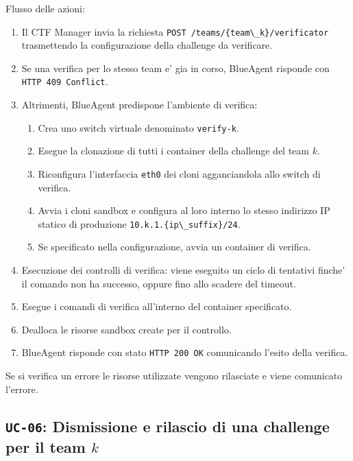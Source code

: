 Flusso delle azioni:

\begin{enumerate}
\def\labelenumi{\arabic{enumi}.}
\tightlist
\item
  Il CTF Manager invia la richiesta
  \passthrough{\lstinline!POST /teams/\{team\_k\}/verificator!}
  trasmettendo la configurazione della challenge da verificare.
\item
  Se una verifica per lo stesso team e' gia in corso, BlueAgent risponde
  con \passthrough{\lstinline!HTTP 409 Conflict!}.
\item
  Altrimenti, BlueAgent predispone l'ambiente di verifica:

  \begin{enumerate}
  \def\labelenumii{\arabic{enumii}.}
  \tightlist
  \item
    Crea uno switch virtuale denominato
    \passthrough{\lstinline!verify-k!}.
  \item
    Esegue la clonazione di tutti i container della challenge del team
    \(k\).
  \item
    Riconfigura l'interfaccia \passthrough{\lstinline!eth0!} dei cloni
    agganciandola allo switch di verifica.
  \item
    Avvia i cloni sandbox e configura al loro interno lo stesso
    indirizzo IP statico di produzione
    \passthrough{\lstinline!10.k.1.\{ip\_suffix\}/24!}.
  \item
    Se specificato nella configurazione, avvia un container di verifica.
  \end{enumerate}
\item
  Esecuzione dei controlli di verifica: viene eseguito un ciclo di
  tentativi finche' il comando non ha successo, oppure fino allo scadere
  del timeout.
\item
  Esegue i comandi di verifica all'interno del container specificato.
\item
  Dealloca le risorse sandbox create per il controllo.
\item
  BlueAgent risponde con stato \passthrough{\lstinline!HTTP 200 OK!}
  comunicando l'esito della verifica.
\end{enumerate}

Se si verifica un errore le risorse utilizzate vengono rilasciate e
viene comunicato l'errore.

\subsection{\texorpdfstring{\texttt{UC-06}: Dismissione e rilascio di
una challenge per il team
\(k\)}{UC-06: Dismissione e rilascio di una challenge per il team k}}\label{uc-06-dismissione-e-rilascio-di-una-challenge-per-il-team-k}

